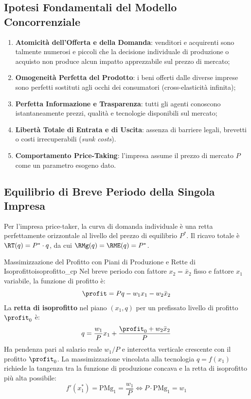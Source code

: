 \subsection{Ipotesi Fondamentali del Modello Concorrenziale}
\begin{enumerate}
    \item \textbf{Atomicità dell'Offerta e della Domanda}: venditori e acquirenti sono talmente numerosi e piccoli che la decisione individuale di produzione o acquisto non produce alcun impatto apprezzabile sul prezzo di mercato;
    \item \textbf{Omogeneità Perfetta del Prodotto}: i beni offerti dalle diverse imprese sono perfetti sostituti agli occhi dei consumatori (cross-elasticità infinita);
    \item \textbf{Perfetta Informazione e Trasparenza}: tutti gli agenti conoscono istantaneamente prezzi, qualità e tecnologie disponibili sul mercato;
    \item \textbf{Libertà Totale di Entrata e di Uscita}: assenza di barriere legali, brevetti o costi irrecuperabili (\textit{sunk costs}).
    \item \textbf{Comportamento Price-Taking}: l'impresa assume il prezzo di mercato $P$ come un parametro esogeno dato.
\end{enumerate}

\subsection{Equilibrio di Breve Periodo della Singola Impresa}
Per l'impresa price-taker, la curva di domanda individuale è una retta perfettamente orizzontale al livello del prezzo di equilibrio $P^*$. Il ricavo totale è $\RT(q) = P^* \cdot q$, da cui $\RMg(q) = \RME(q) = P^*$.

\begin{modello}{Massimizzazione del Profitto con Piani di Produzione e Rette di Isoprofitto}{isoprofitto_cp}
Nel breve periodo con fattore $x_2 = \bar{x}_2$ fisso e fattore $x_1$ variabile, la funzione di profitto è:
\begin{equation}
    \profit = P q - w_1 x_1 - w_2 \bar{x}_2
\end{equation}
La \textbf{retta di isoprofitto} nel piano $(x_1, q)$ per un prefissato livello di profitto $\profit_0$ è:
\begin{equation}
    q = \frac{w_1}{P} x_1 + \frac{\profit_0 + w_2 \bar{x}_2}{P}
\end{equation}
Ha pendenza pari al salario reale $w_1/P$ e intercetta verticale crescente con il profitto $\profit_0$. La massimizzazione vincolata alla tecnologia $q = f(x_1)$ richiede la tangenza tra la funzione di produzione concava e la retta di isoprofitto più alta possibile:
\begin{equation}
    f'(x_1^*) = \mathrm{PMg}_1 = \frac{w_1}{P} \iff P \cdot \mathrm{PMg}_1 = w_1
\end{equation}
\end{modello}

